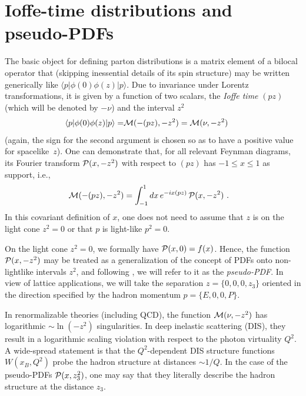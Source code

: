 \section{Ioffe-time distributions and pseudo-PDFs}



 The basic object for defining parton distributions is a matrix element
 of a bilocal operator that  (skipping inessential details of  its
 spin structure)   may be written   generically  like
 $\langle  p | \phi (0)  \phi(z)  | p \rangle $.
Due to invariance under Lorentz transformations, it is given by a function of two scalars,
 the  {\it Ioffe time}   $(pz)$  \cite{Ioffe:1969kf}
 (which will  be denoted by $-\nu$)  and  the interval  $z^2$
  \begin{align}
  \langle p |   \phi(0) \phi (z)|p \rangle
=  & {\cal M} (-(pz), -z^2)  =  {\cal M} (\nu, -z^2)
\,
 \
\label{lorentz}
\end{align}
 (again, the sign for the second argument   is   chosen  so as to have
  a positive value  for \mbox{spacelike $z$)}.
 One can demonstrate \cite{Radyushkin:2016hsy,Radyushkin:1983wh}    that, for all relevant Feynman diagrams,
 its  Fourier transform  ${\cal P} (x, -z^2)$ with respect to $(pz)$
 has $-1 \leq x \leq 1$ as support, i.e.,
   \begin{align}
 {\cal M} (-(pz), -z^2)
&   =
 \int_{-1}^1 dx
 \, e^{-i x (pz) } \,  {\cal P} (x, -z^2)  \   .
  \label{MPD}
\end{align}
   In this  covariant  definition of  $x$,  one does not need to assume that
    $z$ is on the light cone
$z^2=0$ or that $p$   is light-like $p^2=0$.

  On the light cone $z^2=0$, we formally have
 \mbox{$   {\cal P} (x, 0) =f(x) $.}  Hence, the function $ {\cal P} (x, -z^2) $
 may be treated as   a generalization of the concept of
PDFs onto non-lightlike intervals $z^2$, and  following   \cite{Radyushkin:2017cyf} ,  we will  refer to it as the
 {\it pseudo-PDF}.  In view of lattice applications, we will take the separation
$z=\{0,0,0,z_3\}$ oriented  in the direction specified by the hadron momentum $p=\{E,0,0,P\}$.



  In renormalizable theories (including QCD),
  the function  $ {\cal M} (\nu, -z^2)  $
 has  logarithmic $\sim \ln (-z^2)$  singularities.
 In deep inelastic scattering (DIS), they  result
 in a logarithmic  scaling violation with respect
 to the photon virtuality  $Q^2$.
 A wide-spread  statement is that the \mbox{$Q^2$-dependent}   DIS structure functions
  $W(x_B,Q^2)$  probe the   hadron structure
 at distances $\sim 1/Q$.
 In the case  of the pseudo-PDFs ${\cal P} (x,z_3^2)$,
 one may say that  they literally describe the hadron structure
 at  the distance $z_3$.

